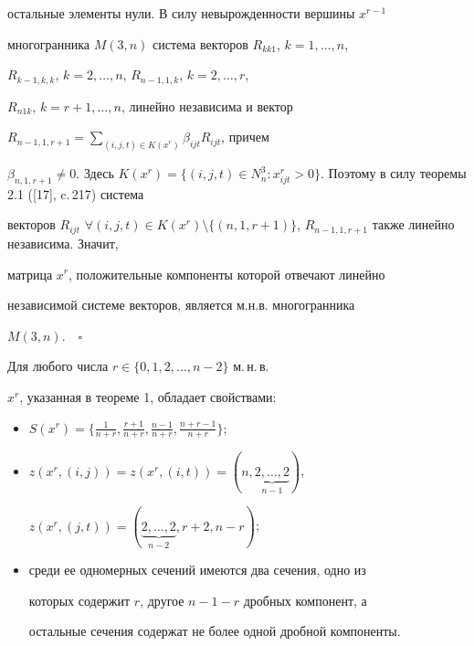 остальные элементы нули. В силу невырожденности вершины $x^{r-1}$


многогранника $M(3,n)$ система векторов $R_{kk1}$, $k=1,\dotsc,n$,


$R_{k-1,k,k}$, $k=2,\dotsc,n$, $R_{n-1,1,k}$, $k=2,\dotsc,r$,


$R_{n1k}$, $k=r+1,\dotsc,n$, линейно независима и вектор


$R_{n-1,1,r+1}=\sum\limits_{(i,j,t)\in K(x^r)}\beta_{ijt}R_{ijt}$, причем


$\beta_{n,1,r+1}\neq 0$. Здесь $K(x^r)=\{(i ,j,t)\in N_n^3 :


x_{ijt}^r > 0\}$. Поэтому в силу теоремы 2.1 ([17], c.\,217) система


векторов $R_{ijt}$ $\forall (i,j,t)\in K(x^r)\setminus


\{(n,1,r+1)\}$, $R_{n-1,1,r+1}$ также линейно независима. Значит,


матрица $x^r$, положительные компоненты которой отвечают линейно


независимой системе векторов, является м.н.в. многогранника


$M(3,n)$.$\quad\square$





\begin{cor}


Для любого числа $r\in \{0,1,2,\dotsc,n-2\}$ м.\,н.\,в.


$x^r$, указанная в теореме 1, обладает свойствами:


\begin{itemize}


\item[1)] $S(x^r)=\{\frac{1}{n+r},\frac{r+1}{n+r},


\frac{n-1}{n+r},\frac{n+r-1}{n+r} \}$;


\item[2)] $z(x^r,(i,j))=z(x^r,(i,t))=(n,


\underbrace{2,\dotsc,2}_{n-1})$,


$z(x^r,(j,t))=(\underbrace{2,\dotsc,2}_{n-2},r+2,n-r)$;


\item[3)] среди ее одномерных сечений имеются два сечения, одно из


которых содержит $r$, другое $n-1-r$ дробных компонент, а


остальные сечения содержат не более одной дробной компоненты.


\end{itemize}


\end{cor}





